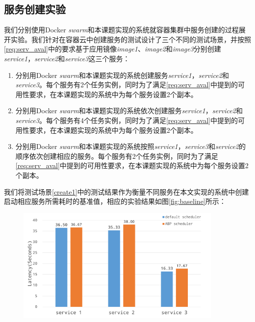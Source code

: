 \subsection{服务创建实验}\label{sec:serv_creation}
我们分别使用Docker \emph{swarm}和本课题实现的系统就容器集群中服务创建的过程展开实验。我们针对在容器云中创建服务的测试设计了三个不同的测试场景，并按照\ref{req:serv_aval}中的要求基于应用镜像\emph{image1}、\emph{image2}和\emph{image3}分别创建\emph{service1}，\emph{service2}和\emph{service3}这三个服务：
\begin{enumerate}
\item\label{create1} 分别用Docker \emph{swarm}和本课题实现的系统创建服务\emph{service1}，\emph{service2}和\emph{service3}。每个服务有2个任务实例，同时为了满足\ref{req:serv_aval}中提到的可用性要求，在本课题实现的系统中为每个服务设置2个副本。
\item\label{create2} 分别用Docker \emph{swarm}和本课题实现的系统依次创建服务\emph{service1}，\emph{service2}和\emph{service3}。每个服务有4个任务实例，同时为了满足\ref{req:serv_aval}中提到的可用性要求，在本课题实现的系统中为每个服务设置2个副本。
\item\label{create3} 分别用Docker \emph{swarm}和本课题实现的系统按照\emph{service1}，\emph{service3}和\emph{service2}的顺序依次创建相应的服务。每个服务有2个任务实例，同时为了满足\ref{req:serv_aval}中提到的可用性要求，在本课题实现的系统中为每个服务设置2个副本。
\end{enumerate}

我们将测试场景\ref{create1}中的测试结果作为衡量不同服务在本文实现的系统中创建启动相应服务所需耗时的基准值，相应的实验结果如图\ref{fig:baseline}所示：
\begin{figure}[H]
\centering
\includegraphics[width=0.9\textwidth]{./figure/baseline}
\end{figure}

